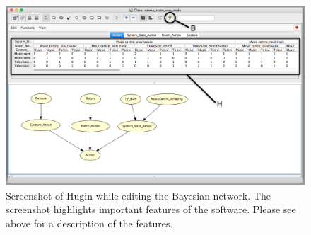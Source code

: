 \begin{figure}[h!]
\centering
\includegraphics[width=\textwidth]{images/hugin-functionality-editing}
\caption{Screenshot of Hugin while editing the Bayesian network. The screenshot highlights important features of the software. Please see above for a description of the features.}
\label{fig:design:bayesian-network:hugin-functionality-editing}
\end{figure}

